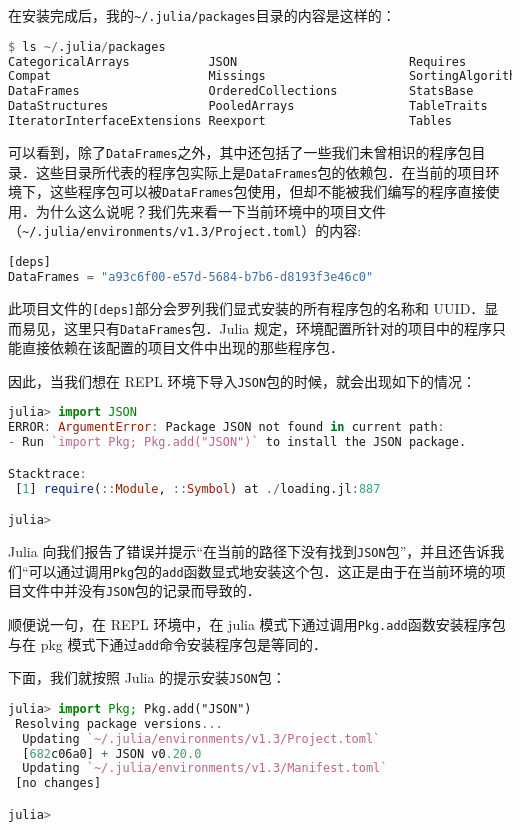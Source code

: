 在安装完成后，我的\verb|~/.julia/packages|目录的内容是这样的：

\begin{lstlisting}[language=julia]
$ ls ~/.julia/packages
CategoricalArrays           JSON                        Requires
Compat                      Missings                    SortingAlgorithms
DataFrames                  OrderedCollections          StatsBase
DataStructures              PooledArrays                TableTraits
IteratorInterfaceExtensions Reexport                    Tables
\end{lstlisting}

可以看到，除了\verb|DataFrames|之外，其中还包括了一些我们未曾相识的程序包目录．这些目录所代表的程序包实际上是\verb|DataFrames|包的依赖包．在当前的项目环境下，这些程序包可以被\verb|DataFrames|包使用，但却不能被我们编写的程序直接使用．为什么这么说呢？我们先来看一下当前环境中的项目文件（\verb|~/.julia/environments/v1.3/Project.toml|）的内容:

\begin{lstlisting}[language=julia]
[deps]
DataFrames = "a93c6f00-e57d-5684-b7b6-d8193f3e46c0"
\end{lstlisting}

此项目文件的\verb|[deps]|部分会罗列我们显式安装的所有程序包的名称和 UUID．显而易见，这里只有\verb|DataFrames|包．Julia 规定，环境配置所针对的项目中的程序只能直接依赖在该配置的项目文件中出现的那些程序包．

因此，当我们想在 REPL 环境下导入\verb|JSON|包的时候，就会出现如下的情况：

\begin{lstlisting}[language=julia]
julia> import JSON
ERROR: ArgumentError: Package JSON not found in current path:
- Run `import Pkg; Pkg.add("JSON")` to install the JSON package.

Stacktrace:
 [1] require(::Module, ::Symbol) at ./loading.jl:887

julia> 
\end{lstlisting}

Julia 向我们报告了错误并提示“在当前的路径下没有找到\verb|JSON|包”，并且还告诉我们“可以通过调用\verb|Pkg|包的\verb|add|函数显式地安装这个包．这正是由于在当前环境的项目文件中并没有\verb|JSON|包的记录而导致的．

顺便说一句，在 REPL 环境中，在 julia 模式下通过调用\verb|Pkg.add|函数安装程序包与在 pkg 模式下通过\verb|add|命令安装程序包是等同的．

下面，我们就按照 Julia 的提示安装\verb|JSON|包：

\begin{lstlisting}[language=julia]
julia> import Pkg; Pkg.add("JSON")
 Resolving package versions...
  Updating `~/.julia/environments/v1.3/Project.toml`
  [682c06a0] + JSON v0.20.0
  Updating `~/.julia/environments/v1.3/Manifest.toml`
 [no changes]

julia> 
\end{lstlisting}

